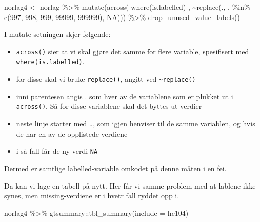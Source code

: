 \documentclass[
  letterpaper,
  DIV=11,
  numbers=noendperiod]{scrreprt}
\newenvironment{Shaded}{\begin{snugshade}}{\end{snugshade}}
\newcommand{\AttributeTok}[1]{\textcolor[rgb]{0.40,0.45,0.13}{#1}}
\newcommand{\ConstantTok}[1]{\textcolor[rgb]{0.56,0.35,0.01}{#1}}
\newcommand{\DecValTok}[1]{\textcolor[rgb]{0.68,0.00,0.00}{#1}}
\newcommand{\FunctionTok}[1]{\textcolor[rgb]{0.28,0.35,0.67}{#1}}
\newcommand{\NormalTok}[1]{\textcolor[rgb]{0.00,0.23,0.31}{#1}}
\newcommand{\OtherTok}[1]{\textcolor[rgb]{0.00,0.23,0.31}{#1}}
\newcommand{\SpecialCharTok}[1]{\textcolor[rgb]{0.37,0.37,0.37}{#1}}
\providecommand{\tightlist}{%
  \setlength{\itemsep}{0pt}\setlength{\parskip}{0pt}}\usepackage{longtable,booktabs,array}
\begin{document}
\begin{Shaded}
\begin{Highlighting}[]
\NormalTok{norlag4 }\OtherTok{\textless{}{-}}\NormalTok{ norlag }\SpecialCharTok{\%\textgreater{}\%} 
  \FunctionTok{mutate}\NormalTok{(}\FunctionTok{across}\NormalTok{( }\FunctionTok{where}\NormalTok{(is.labelled) ,  }\SpecialCharTok{\textasciitilde{}}\FunctionTok{replace}\NormalTok{(., }
\NormalTok{                                        . }\SpecialCharTok{\%in\%} \FunctionTok{c}\NormalTok{(}\DecValTok{997}\NormalTok{, }\DecValTok{998}\NormalTok{, }\DecValTok{999}\NormalTok{, }\DecValTok{99999}\NormalTok{, }\DecValTok{999999}\NormalTok{), }
                                        \ConstantTok{NA}\NormalTok{))) }\SpecialCharTok{\%\textgreater{}\%}  
  \FunctionTok{drop\_unused\_value\_labels}\NormalTok{()                                           }
\end{Highlighting}
\end{Shaded}

I mutate-setningen skjer følgende:

\begin{itemize}
\tightlist
\item
  \texttt{across()} sier at vi skal gjøre det samme for flere variable,
  spesifisert med \texttt{where(is.labelled)}.
\item
  for disse skal vi bruke \texttt{replace()}, angitt ved
  \texttt{\textasciitilde{}replace()}
\item
  inni parentesen angis . som hver av de variablene som er plukket ut i
  \texttt{across()}. Så for disse variablene skal det byttes ut verdier
\item
  neste linje starter med \texttt{.}, som igjen henviser til de samme
  variablen, og hvis de har en av de opplistede verdiene
\item
  i så fall får de ny verdi \texttt{NA}
\end{itemize}

Dermed er samtlige labelled-variable omkodet på denne måten i en fei.

Da kan vi lage en tabell på nytt. Her får vi samme problem med at
lablene ikke synes, men missing-verdiene er i hvetr fall ryddet opp i.

\begin{Shaded}
\begin{Highlighting}[]
\NormalTok{norlag4 }\SpecialCharTok{\%\textgreater{}\%} 
\NormalTok{  gtsummary}\SpecialCharTok{::}\FunctionTok{tbl\_summary}\NormalTok{(}\AttributeTok{include =}\NormalTok{ he104)}
\end{Highlighting}
\end{Shaded}
\end{document}
